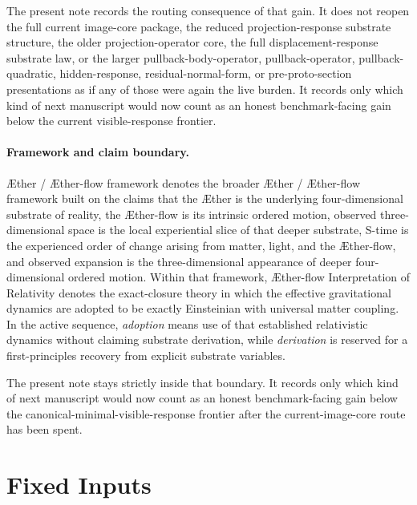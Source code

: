 \documentclass[11pt]{article}
\newcommand{\Aether}{\AE{}ther}
\newcommand{\Aflow}{\AE{}ther-flow}
\newcommand{\TheoryName}{\Aflow{} Interpretation of Relativity}
\newcommand{\TheoryProgram}{\Aether{} / \Aflow{} framework}
\begin{document}
The present note records the routing consequence of that gain. It does not reopen the full current image-core package, the reduced projection-response substrate structure, the older projection-operator core, the full displacement-response substrate law, or the larger pullback-body-operator, pullback-operator, pullback-quadratic, hidden-response, residual-normal-form, or pre-proto-section presentations as if any of those were again the live burden. It records only which kind of next manuscript would now count as an honest benchmark-facing gain below the current visible-response frontier.

\paragraph{Framework and claim boundary.}
\TheoryProgram{} denotes the broader \Aether{} / \Aflow{} framework built on the claims that the \Aether{} is the underlying four-dimensional substrate of reality, the \Aflow{} is its intrinsic ordered motion, observed three-dimensional space is the local experiential slice of that deeper substrate, S-time is the experienced order of change arising from matter, light, and the \Aflow{}, and observed expansion is the three-dimensional appearance of deeper four-dimensional ordered motion. Within that framework, \TheoryName{} denotes the exact-closure theory in which the effective gravitational dynamics are adopted to be exactly Einsteinian with universal matter coupling. In the active sequence, \emph{adoption} means use of that established relativistic dynamics without claiming substrate derivation, while \emph{derivation} is reserved for a first-principles recovery from explicit substrate variables.

The present note stays strictly inside that boundary. It records only which kind of next manuscript would now count as an honest benchmark-facing gain below the canonical-minimal-visible-response frontier after the current-image-core route has been spent.

\section{Fixed Inputs}
\end{document}
